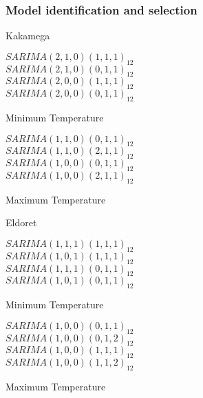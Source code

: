 \documentclass[]{beamer}
\begin{document}
\begin{frame}
	\frametitle{Model identification and selection}
	\fontsize{8pt}{7.2}\selectfont
	\begin{table}[h!]
		\begin{minipage}{.5\linewidth}
			Kakamega
			\begin{center}
				$ SARIMA(2,1,0)(1,1,1)_{12} $\\ 
				$ SARIMA(2,1,0)(0,1,1)_{12} $\\
				$ SARIMA(2,0,0)(1,1,1)_{12} $\\
				$ SARIMA(2,0,0)(0,1,1)_{12} $\\
			\end{center}
			\caption{Minimum Temperature}
		\end{minipage}\hfill
		\label{tab:table61}%
		\begin{minipage}{.5\linewidth}
			\begin{center}
				$ SARIMA(1,1,0)(0,1,1)_{12} $\\ 
				$ SARIMA(1,1,0)(2,1,1)_{12} $\\
				$ SARIMA(1,0,0)(0,1,1)_{12} $\\ 
				$ SARIMA(1,0,0)(2,1,1)_{12} $\\
			\end{center}
			\caption{Maximum Temperature}
		\end{minipage}\hfill
		\label{tab:table62}
	\end{table}
\begin{table}[h!]
	\begin{minipage}{.5\linewidth}
		Eldoret
		\begin{center}
			$ SARIMA(1,1,1)(1,1,1)_{12} $\\ 
			$ SARIMA(1,0,1)(1,1,1)_{12} $\\
			$ SARIMA(1,1,1)(0,1,1)_{12} $\\
			$ SARIMA(1,0,1)(0,1,1)_{12} $\\
		\end{center}
		\caption{Minimum Temperature}
	\end{minipage}\hfill
	\label{tab:table63}%
	\begin{minipage}{.5\linewidth}
		\begin{center}
			$ SARIMA(1,0,0)(0,1,1)_{12} $\\ 
			$ SARIMA(1,0,0)(0,1,2)_{12} $\\
			$ SARIMA(1,0,0)(1,1,1)_{12} $\\ 
			$ SARIMA(1,0,0)(1,1,2)_{12} $\\
		\end{center}
		\caption{Maximum Temperature}
	\end{minipage}\hfill
	\label{tab:table64}
\end{table}
\end{frame}
\end{document}
